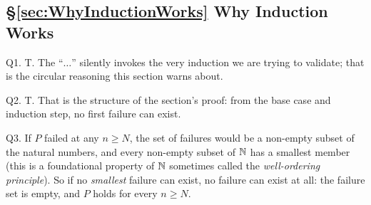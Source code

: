 \subsection*{\S\ref{sec:WhyInductionWorks} Why Induction Works}
\hypertarget{a:ch0:whyinduction}{}
\noindent Q1. T. The ``$\ldots$'' silently invokes the very induction we are trying to validate; that is the circular reasoning this section warns about.\par\smallskip
\noindent Q2. T. That is the structure of the section's proof: from the base case and induction step, no first failure can exist.\par\smallskip
\noindent Q3. If $P$ failed at any $n \geq N$, the set of failures would be a non-empty subset of the natural numbers, and every non-empty subset of ${\mathbb{N}}$ has a smallest member (this is a foundational property of ${\mathbb{N}}$ sometimes called the \textit{well-ordering principle}). So if no \emph{smallest} failure can exist, no failure can exist at all: the failure set is empty, and $P$ holds for every $n \geq N$.\par\smallskip
\hfill{}\par\medskip




